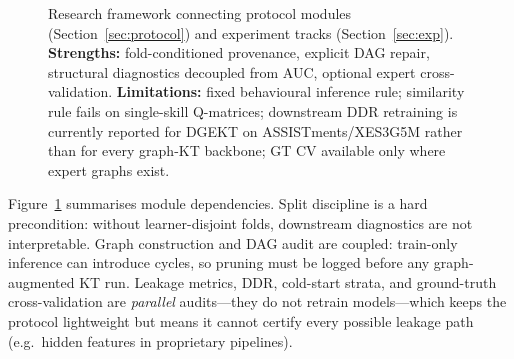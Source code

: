 \documentclass[pdflatex,sn-basic]{sn-jnl}
\newcommand{\DDR}{\textsc{DDR}}
\begin{document}
\begin{figure}[!t]
\centering
{}
\caption{Research framework connecting protocol modules (Section~\ref{sec:protocol})
and experiment tracks (Section~\ref{sec:exp}).
\textbf{Strengths:} fold-conditioned provenance, explicit DAG repair,
structural diagnostics decoupled from AUC, optional expert cross-validation.
\textbf{Limitations:} fixed behavioural inference rule; similarity rule
fails on single-skill Q-matrices; downstream \DDR{} retraining is currently
reported for DGEKT on ASSISTments/XES3G5M rather than for every graph-KT
backbone; GT CV available only where expert graphs exist.}
\label{fig:framework}
\end{figure}

Figure~\ref{fig:framework} summarises module dependencies. Split
discipline is a hard precondition: without learner-disjoint folds,
downstream diagnostics are not interpretable. Graph construction and DAG
audit are coupled: train-only inference can introduce cycles, so pruning
must be logged before any graph-augmented KT run. Leakage metrics,
\DDR{}, cold-start strata, and ground-truth cross-validation are
\emph{parallel} audits---they do not retrain models---which keeps the
protocol lightweight but means it cannot certify every possible leakage
path (e.g.\ hidden features in proprietary pipelines).
\end{document}
